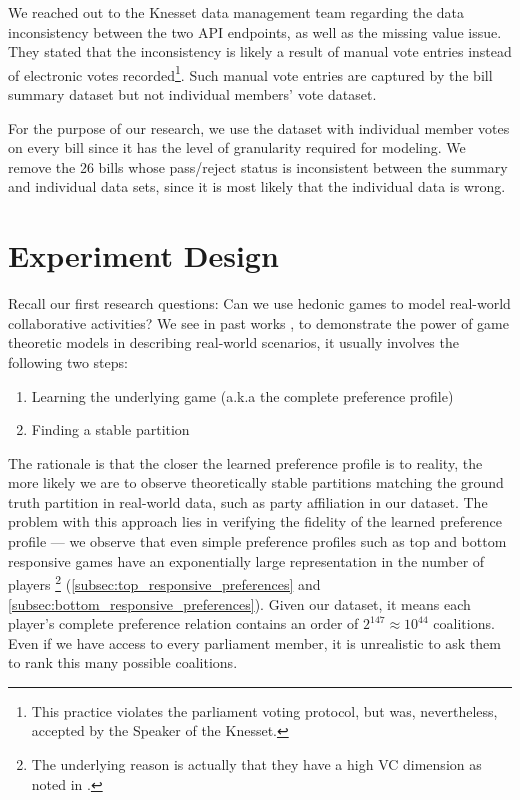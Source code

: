 We reached out to the Knesset data management team regarding the data inconsistency between
the two API endpoints, as well as the missing value issue.
They stated that the inconsistency
is likely a result of manual vote entries instead of electronic votes recorded\footnote{This practice violates the parliament voting protocol, but was, nevertheless, accepted by the Speaker of the Knesset.}.
Such manual vote entries are captured by the bill summary dataset but not individual members' vote dataset.

For the purpose of our research, we use the dataset with individual member
votes on every bill since it has the level of granularity required for modeling.
We remove the 26 bills whose pass/reject status is inconsistent between
the summary and individual data sets, since it is most likely that the
individual data is wrong.


\section{Experiment Design}
\label{sec:experiment_design}

Recall our first research questions: Can we use hedonic games to model
real-world collaborative activities?
We see in past works \cite{Vainsencher2011BundleSB, Balcan2012}, to demonstrate
the power of game theoretic models in describing real-world scenarios, it
usually involves the following two steps:

\begin{enumerate}
  \item Learning the underlying game (a.k.a the complete preference profile)
  \item Finding a stable partition
\end{enumerate}

The rationale is that the closer the learned preference profile is to reality,
the more likely we are to observe theoretically stable partitions matching
the ground truth partition in real-world data, such as party affiliation in
our dataset.
The problem with this approach lies in verifying the fidelity of the learned
preference profile --- we observe that even simple preference profiles such as top
and bottom responsive games have an exponentially large representation in the number of players \footnote{The underlying reason is actually that they have a high VC dimension as noted in \cite{ijcai2017-380}.}
(\autoref{subsec:top_responsive_preferences} and
\autoref{subsec:bottom_responsive_preferences}).
Given our dataset, it means each player's complete preference relation contains
an order of $2^{147} \approx 10^{44}$ coalitions.
Even if we have access to every parliament member, it is unrealistic to ask them
to rank this many possible coalitions.

